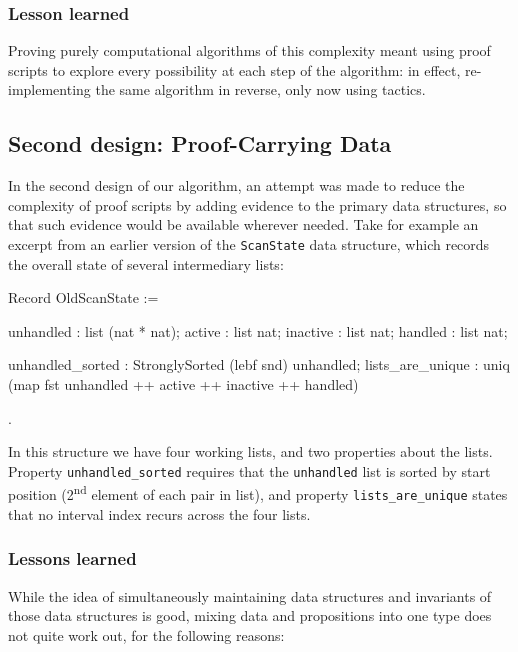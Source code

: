 \documentclass{llncs}
\newif\ifdraft\draftfalse  %
\newcommand{\comment}[3]{\ifdraft\textcolor{#1}{[#2: #3]}\else\fi}
\newcommand{\gts}[1]{\comment{OliveGreen}{GTS}{#1}}
\begin{document}
\subsubsection*{Lesson learned}

Proving purely computational algorithms of this complexity meant using proof
scripts to explore every possibility at each step of the algorithm: in effect,
re-implementing the same algorithm in reverse, only now using tactics.

\subsection{Second design: Proof-Carrying Data}
\label{sec:depinduct}

In the second design of our algorithm, an attempt was made to reduce the
complexity of proof scripts by adding evidence to the primary data structures,
so that such evidence would be available wherever needed.  Take for example an
excerpt from an earlier version of the \texttt{ScanState} data structure,
which records the overall state of several intermediary lists:
\gts{maybe call the record type ``ScanStateV2''?}

\begin{coq_example*}
Record OldScanState := {
    unhandled : list (nat * nat);
    active    : list nat;
    inactive  : list nat;
    handled   : list nat;

    unhandled_sorted : StronglySorted (lebf snd) unhandled;
    lists_are_unique : uniq (map fst unhandled ++ active ++
                             inactive ++ handled)
}.
\end{coq_example*}

In this structure we have four working lists, and two properties about
the lists. Property \texttt{unhandled\_sorted} requires that the
\texttt{unhandled} list is sorted by start position
(2\textsuperscript{nd} element of each pair in list), and property
\texttt{lists\_are\_unique} states that no interval index recurs
across the four lists.

\subsubsection*{Lessons learned}

While the idea of simultaneously maintaining data structures and
invariants of those data structures is good, mixing data and
propositions into one type does not quite work out, for the following
reasons: 
\end{document}
